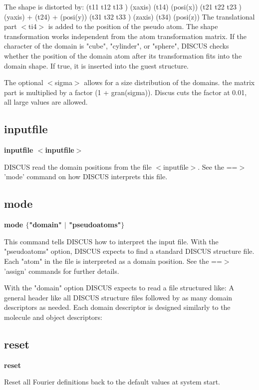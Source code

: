 The shape is distorted by: 
(t11  t12  t13 ) (xaxis)   (t14)   (posi(x)) 
(t21  t22  t23 ) (yaxis) + (t24) + (posi(y)) 
(t31  t32  t33 ) (zaxis)   (t34)   (posi(z)) 
The translational part $ <$ti4$> $ is added to the position of the 
pseudo atom. The shape transformation works independent from the atom 
transformation matrix. 
If the character of the domain is "cube", "cylinder", or "sphere", 
DISCUS checks whether the position of the domain atom after its 
transformation fits into the domain shape. If true, it is inserted into 
the guest structure. 
\par
The optional $ <$sigma$> $ allows for a size distribution of the domains. 
the matrix part is multiplied by a factor (1 + gran(sigma)). 
Discus cuts the factor at 0.01, all large values are allowed. 
\subsection*{inputfile}
{\bf inputfile $ <$inputfile$> $ \par }
\par
\vspace{3pt}
DISCUS read the domain positions from the file $ <$inputfile$> $. See the 
==$> $ 'mode' command on how DISCUS interprets this file. 
\subsection*{mode}
{\bf mode $ \{$"domain" $| $ "pseudoatoms"$\} $ \par }
\par
\vspace{3pt}
This command tells DISCUS how to interpret the input file. 
With the "pseudoatoms" option, DISCUS expects to find a standard 
DISCUS structure file. Each "atom" in the file is interpreted as 
a domain position. See the ==$> $ 'assign' commands for further details. 
\par
With the "domain" option DISCUS expects to read a file structured 
like: 
A general header like all DISCUS structure files followed by as many 
domain descriptors as needed. Each domain descriptor is designed 
similarly to the molecule and object descriptors: 
\subsection*{reset}
{\bf reset \par }
\par
\vspace{3pt}
Reset all Fourier definitions back to the default values at 
system start. 
